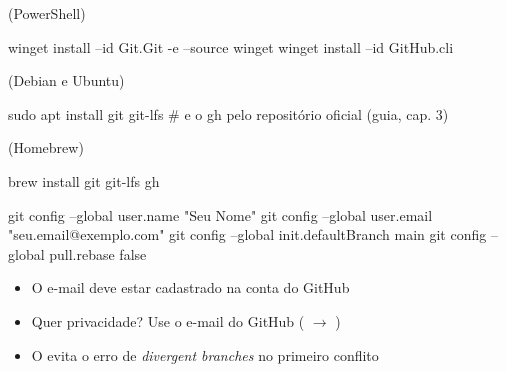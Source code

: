 
\begin{frame}[fragile]{}
  \vspace{0.2em}
   {\footnotesize (PowerShell)}
\begin{sh}
winget install --id Git.Git -e --source winget
winget install --id GitHub.cli
\end{sh}
   {\footnotesize (Debian e Ubuntu)}
\begin{sh}
sudo apt install git git-lfs      # e o gh pelo repositório oficial (guia, cap. 3)
\end{sh}
   {\footnotesize (Homebrew)}
\begin{sh}
brew install git git-lfs gh
\end{sh}

  \begin{center}
  \end{center}

\end{frame}

\begin{frame}[fragile]{}
\begin{sh}
git config --global user.name "Seu Nome"
git config --global user.email "seu.email@exemplo.com"
git config --global init.defaultBranch main
git config --global pull.rebase false
\end{sh}

  \vspace{0.6em}
  \begin{itemize}
    \item O e-mail deve estar cadastrado na conta do GitHub
    \item Quer privacidade? Use o e-mail  do GitHub ( \(\rightarrow\) )
    \item O  evita o erro de \emph{divergent branches} no primeiro conflito
  \end{itemize}

\end{frame}

